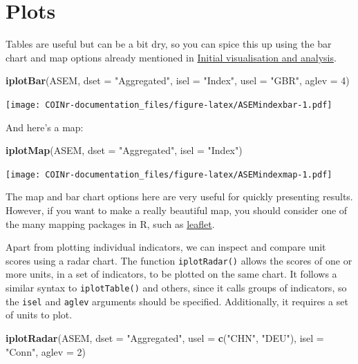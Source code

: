 \documentclass[
]{book}
\newenvironment{Shaded}{\begin{snugshade}}{\end{snugshade}}
\newcommand{\DataTypeTok}[1]{\textcolor[rgb]{0.13,0.29,0.53}{#1}}
\newcommand{\DecValTok}[1]{\textcolor[rgb]{0.00,0.00,0.81}{#1}}
\newcommand{\KeywordTok}[1]{\textcolor[rgb]{0.13,0.29,0.53}{\textbf{#1}}}
\newcommand{\NormalTok}[1]{#1}
\newcommand{\StringTok}[1]{\textcolor[rgb]{0.31,0.60,0.02}{#1}}
\begin{document}
\hypertarget{plots}{%
\section{Plots}\label{plots}}

Tables are useful but can be a bit dry, so you can spice this up using the bar chart and map options already mentioned in \protect\hyperlink{initial-visualisation-and-analysis}{Initial visualisation and analysis}.

\begin{Shaded}
\begin{Highlighting}[]
\KeywordTok{iplotBar}\NormalTok{(ASEM, }\DataTypeTok{dset =} \StringTok{"Aggregated"}\NormalTok{, }\DataTypeTok{isel =} \StringTok{"Index"}\NormalTok{, }\DataTypeTok{usel =} \StringTok{"GBR"}\NormalTok{, }\DataTypeTok{aglev =} \DecValTok{4}\NormalTok{)}
\end{Highlighting}
\end{Shaded}

\texttt{[image: COINr-documentation\_files/figure-latex/ASEMindexbar-1.pdf]}

And here's a map:

\begin{Shaded}
\begin{Highlighting}[]
\KeywordTok{iplotMap}\NormalTok{(ASEM, }\DataTypeTok{dset =} \StringTok{"Aggregated"}\NormalTok{, }\DataTypeTok{isel =} \StringTok{"Index"}\NormalTok{)}
\end{Highlighting}
\end{Shaded}

\texttt{[image: COINr-documentation\_files/figure-latex/ASEMindexmap-1.pdf]}

The map and bar chart options here are very useful for quickly presenting results. However, if you want to make a really beautiful map, you should consider one of the many mapping packages in R, such as \href{https://rstudio.github.io/leaflet/}{leaflet}.

Apart from plotting individual indicators, we can inspect and compare unit scores using a radar chart. The function \texttt{iplotRadar()} allows the scores of one or more units, in a set of indicators, to be plotted on the same chart. It follows a similar syntax to \texttt{iplotTable()} and others, since it calls groups of indicators, so the \texttt{isel} and \texttt{aglev} arguments should be specified. Additionally, it requires a set of units to plot.

\begin{Shaded}
\begin{Highlighting}[]
\KeywordTok{iplotRadar}\NormalTok{(ASEM, }\DataTypeTok{dset =} \StringTok{"Aggregated"}\NormalTok{, }\DataTypeTok{usel =} \KeywordTok{c}\NormalTok{(}\StringTok{"CHN"}\NormalTok{, }\StringTok{"DEU"}\NormalTok{), }\DataTypeTok{isel =} \StringTok{"Conn"}\NormalTok{, }\DataTypeTok{aglev =} \DecValTok{2}\NormalTok{)}
\end{Highlighting}
\end{Shaded}
\end{document}
